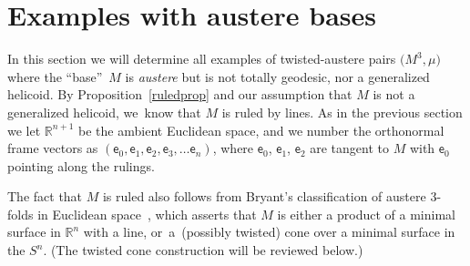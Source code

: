 \documentclass[10pt,a4paper]{amsart}
\def\R{\mathbb{R}}
\def\ve{\mathsf{e}}
\numberwithin{equation}{section}
\begin{document}
\section{Examples with austere bases} \label{austeresec}

{\sloppy
In this section we will determine all examples of twisted-austere pairs $\big(M^3, \mu\big)$ where the ``base''~$M$ is \emph{austere} but is not totally geodesic, nor a generalized helicoid. By Proposition~\ref{ruledprop} and our assumption that $M$ is not a generalized helicoid, we~know that $M$ is ruled by lines. As in the previous section we let $\R^{n+1}$ be the ambient Euclidean space, and we number the orthonormal frame vectors as $(\ve_0, \ve_1, \ve_2, \ve_3, \dots \ve_n)$, where $\ve_0$, $\ve_1$, $\ve_2$ are tangent to $M$ with $\ve_0$ pointing along the rulings.

}

The fact that $M$ is ruled also follows from Bryant's classification of austere 3-folds in Euclidean space~\cite{Br}, which asserts that $M$ is either a product of a minimal surface in $\R^n$ with a line, or~a~(possibly twisted) cone over a minimal surface in the $S^n$. (The twisted cone construction will be reviewed below.)
\end{document}
